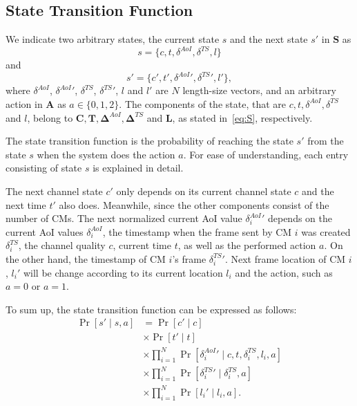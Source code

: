 \documentclass[journal]{IEEEtran}
\begin{document}
\subsection{State Transition Function}
We indicate two arbitrary states, the current state $s$ and the next state $s'$ in $\mathbf{S}$ as 
\begin{equation}
    s=\{c, t, \delta^{AoI}, \delta^{TS}, l \}
\end{equation}
    and 
\begin{equation}
    s'=\{c', t', \delta^{AoI}{}', \delta^{TS}{}', l' \},
\end{equation}
    where $\delta^{AoI}$, $\delta^{AoI}{}'$, $\delta^{TS}$, $\delta^{TS}{}'$, $l$ and $l'$ are $N$ length-size vectors, and an arbitrary action in $\mathbf{A}$ as $a \in \{0,1,2\}$. The components of the state, that are $c, t, \delta^{AoI}, \delta^{TS}$ and $l$, belong to $\mathbf{C}, \mathbf{T}, \mathbf{\Delta}^{AoI}, \mathbf{\Delta}^{TS}$ and $\mathbf{L}$, as stated in~\eqref{eq:S}, respectively.


The state transition function is the probability of reaching the state $s'$ from the state $s$ when the system does the action $a$. For ease of understanding, each entry consisting of state $s$ is explained in detail.

The next channel state $c'$ only depends on its current channel state $c$ and the next time $t'$ also does. Meanwhile, since the other components consist of the number of CMs. The next normalized current AoI value $\delta^{AoI}_{i}{}'$ depends on the current AoI values $\delta^{AoI}_{i}$, the timestamp when the frame sent by CM $i$ was created $\delta^{TS}_{i}$, the channel quality $c$, current time $t$, as well as the performed action $a$. On the other hand, the timestamp of CM $i$'s frame $\delta^{TS}_{i}{}'$. Next frame location of CM $i$, $l_i'$ will be change according to its current location $l_i$ and the action, such as $a=0$ or $a=1$.

To sum up, the state transition function can be expressed as follows:
\begin{equation}
    \begin{split}
        \Pr \left[ {s'\mid s,a} \right] & = {\Pr \left[ {c'\mid c} \right]} \\
        & \times \Pr \left[ {t'\mid t} \right] \\
        & \times \prod_{i=1}^{N} \Pr \left[ {\delta^{AoI}_{i}{}'\mid c, t, {\delta^{TS}_{i}}, l_i, a} \right] \\
        & \times \prod_{i=1}^{N} \Pr \left[ {\delta^{TS}_{i}{}'\mid {\delta^{TS}_{i}}, a} \right] \\
        & \times \prod_{i=1}^{N} \Pr \left[ {l_i'\mid {l_i}, a} \right].
    \end{split}
\label{eq:transition1}
\end{equation}
\end{document}
